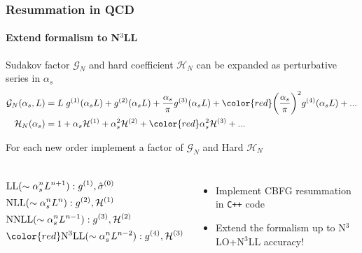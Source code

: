 \documentclass[aspectratio=43]{beamer}
\begin{document}
\begin{frame}

	\frametitle{Resummation in QCD}
	\framesubtitle{Extend formalism to N$^{3}$LL}
	
	\footnotesize
	
	Sudakov factor $\mathcal{G}_{N}$ and hard coefficient $\mathcal{H}_{N}$ can be expanded as perturbative series in $\alpha_{s}$
	\begin{align}
		\mathcal{G}_{N}(\alpha_{s}, L) &= L\;g^{(1)}(\alpha_{s}L) + g^{(2)}(\alpha_{s}L) + \frac{\alpha_{s}}{\pi}g^{(3)}(\alpha_{s}L) + {\color{red} \bigg( \frac{\alpha_{s}}{\pi} \bigg) ^{2}g^{(4)}(\alpha_{s}L)} + ... \nonumber \\
		\mathcal{H}_{N}(\alpha_{s}) &= 1 + \alpha_{s}\mathcal{H}^{(1)} + \alpha_{s}^{2}\mathcal{H}^{(2)} + {\color{red}\alpha_{s}^{2}\mathcal{H}^{(3)}} + ...  \nonumber
	\end{align}
	
	For each new order implement a factor of $\mathcal{G}_{N}$ and Hard $\mathcal{H}_{N}$
	
	\begin{columns}
		
		
		\begin{align}
			&\textrm{LL} (\sim \alpha_{s}^{n}L^{n+1}): g^{(1)}, \hat{\sigma}^{(0)} \nonumber \\
			&\textrm{NLL} (\sim \alpha_{s}^{n}L^{n}): g^{(2)}, \mathcal{H}^{(1)} \nonumber \\
			&\textrm{NNLL} (\sim \alpha_{s}^{n}L^{n-1}): g^{(3)}, \mathcal{H}^{(2)} \nonumber \\
			&{\color{red} \textrm{N$^{3}$LL} (\sim \alpha_{s}^{n}L^{n-2}): g^{(4)}, \mathcal{H}^{(3)}} \nonumber
		\end{align}
		
		
		\begin{itemize}
			\item Implement CBFG resummation \\ 
			in \texttt{C++} code
			\item Extend the formalism up to {\color{red}N$^{3}$LO+N$^{3}$LL} accuracy!
		\end{itemize}
	
	\end{columns}

\end{frame}
\end{document}
